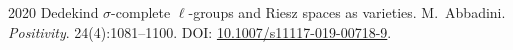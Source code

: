
\pubrow
  {2020}
  {Dedekind {$\sigma$}-complete {$\ell$}-groups and {R}iesz spaces as varieties.}
  {M.\ Abbadini.}
  {\emph{Positivity}. 24(4):1081--1100. DOI: \href{https://doi.org/10.1007/s11117-019-00718-9}{10.1007/s11117-019-00718-9}.}

